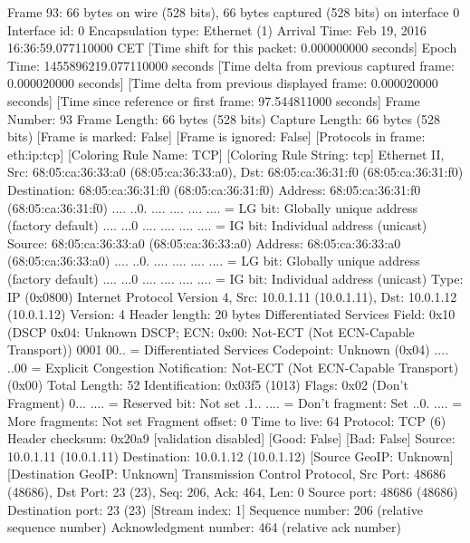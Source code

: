 Frame 93: 66 bytes on wire (528 bits), 66 bytes captured (528 bits) on interface 0
    Interface id: 0
    Encapsulation type: Ethernet (1)
    Arrival Time: Feb 19, 2016 16:36:59.077110000 CET
    [Time shift for this packet: 0.000000000 seconds]
    Epoch Time: 1455896219.077110000 seconds
    [Time delta from previous captured frame: 0.000020000 seconds]
    [Time delta from previous displayed frame: 0.000020000 seconds]
    [Time since reference or first frame: 97.544811000 seconds]
    Frame Number: 93
    Frame Length: 66 bytes (528 bits)
    Capture Length: 66 bytes (528 bits)
    [Frame is marked: False]
    [Frame is ignored: False]
    [Protocols in frame: eth:ip:tcp]
    [Coloring Rule Name: TCP]
    [Coloring Rule String: tcp]
Ethernet II, Src: 68:05:ca:36:33:a0 (68:05:ca:36:33:a0), Dst: 68:05:ca:36:31:f0 (68:05:ca:36:31:f0)
    Destination: 68:05:ca:36:31:f0 (68:05:ca:36:31:f0)
        Address: 68:05:ca:36:31:f0 (68:05:ca:36:31:f0)
        .... ..0. .... .... .... .... = LG bit: Globally unique address (factory default)
        .... ...0 .... .... .... .... = IG bit: Individual address (unicast)
    Source: 68:05:ca:36:33:a0 (68:05:ca:36:33:a0)
        Address: 68:05:ca:36:33:a0 (68:05:ca:36:33:a0)
        .... ..0. .... .... .... .... = LG bit: Globally unique address (factory default)
        .... ...0 .... .... .... .... = IG bit: Individual address (unicast)
    Type: IP (0x0800)
Internet Protocol Version 4, Src: 10.0.1.11 (10.0.1.11), Dst: 10.0.1.12 (10.0.1.12)
    Version: 4
    Header length: 20 bytes
    Differentiated Services Field: 0x10 (DSCP 0x04: Unknown DSCP; ECN: 0x00: Not-ECT (Not ECN-Capable Transport))
        0001 00.. = Differentiated Services Codepoint: Unknown (0x04)
        .... ..00 = Explicit Congestion Notification: Not-ECT (Not ECN-Capable Transport) (0x00)
    Total Length: 52
    Identification: 0x03f5 (1013)
    Flags: 0x02 (Don't Fragment)
        0... .... = Reserved bit: Not set
        .1.. .... = Don't fragment: Set
        ..0. .... = More fragments: Not set
    Fragment offset: 0
    Time to live: 64
    Protocol: TCP (6)
    Header checksum: 0x20a9 [validation disabled]
        [Good: False]
        [Bad: False]
    Source: 10.0.1.11 (10.0.1.11)
    Destination: 10.0.1.12 (10.0.1.12)
    [Source GeoIP: Unknown]
    [Destination GeoIP: Unknown]
Transmission Control Protocol, Src Port: 48686 (48686), Dst Port: 23 (23), Seq: 206, Ack: 464, Len: 0
    Source port: 48686 (48686)
    Destination port: 23 (23)
    [Stream index: 1]
    Sequence number: 206    (relative sequence number)
    Acknowledgment number: 464    (relative ack number)
